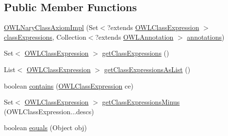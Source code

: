 \subsection*{Public Member Functions}
\begin{DoxyCompactItemize}
\item 
\hyperlink{classuk_1_1ac_1_1manchester_1_1cs_1_1owl_1_1owlapi_1_1_o_w_l_nary_class_axiom_impl_a10f07e8cffe3b2b0a3850e8b11f26d60}{O\-W\-L\-Nary\-Class\-Axiom\-Impl} (Set$<$?extends \hyperlink{interfaceorg_1_1semanticweb_1_1owlapi_1_1model_1_1_o_w_l_class_expression}{O\-W\-L\-Class\-Expression} $>$ \hyperlink{classuk_1_1ac_1_1manchester_1_1cs_1_1owl_1_1owlapi_1_1_o_w_l_nary_class_axiom_impl_a1f49ad91a00e2548f99a93ca8de82f7c}{class\-Expressions}, Collection$<$?extends \hyperlink{interfaceorg_1_1semanticweb_1_1owlapi_1_1model_1_1_o_w_l_annotation}{O\-W\-L\-Annotation} $>$ \hyperlink{classuk_1_1ac_1_1manchester_1_1cs_1_1owl_1_1owlapi_1_1_o_w_l_axiom_impl_af6fbf6188f7bdcdc6bef5766feed695e}{annotations})
\item 
Set$<$ \hyperlink{interfaceorg_1_1semanticweb_1_1owlapi_1_1model_1_1_o_w_l_class_expression}{O\-W\-L\-Class\-Expression} $>$ \hyperlink{classuk_1_1ac_1_1manchester_1_1cs_1_1owl_1_1owlapi_1_1_o_w_l_nary_class_axiom_impl_a4fd9d265e883404fe3065850664a2f5b}{get\-Class\-Expressions} ()
\item 
List$<$ \hyperlink{interfaceorg_1_1semanticweb_1_1owlapi_1_1model_1_1_o_w_l_class_expression}{O\-W\-L\-Class\-Expression} $>$ \hyperlink{classuk_1_1ac_1_1manchester_1_1cs_1_1owl_1_1owlapi_1_1_o_w_l_nary_class_axiom_impl_a09237d0c7ab7c3bbdf4d7607121cada1}{get\-Class\-Expressions\-As\-List} ()
\item 
boolean \hyperlink{classuk_1_1ac_1_1manchester_1_1cs_1_1owl_1_1owlapi_1_1_o_w_l_nary_class_axiom_impl_ae4ddd9a397c0073d0f40a14d40e9b4a3}{contains} (\hyperlink{interfaceorg_1_1semanticweb_1_1owlapi_1_1model_1_1_o_w_l_class_expression}{O\-W\-L\-Class\-Expression} ce)
\item 
Set$<$ \hyperlink{interfaceorg_1_1semanticweb_1_1owlapi_1_1model_1_1_o_w_l_class_expression}{O\-W\-L\-Class\-Expression} $>$ \hyperlink{classuk_1_1ac_1_1manchester_1_1cs_1_1owl_1_1owlapi_1_1_o_w_l_nary_class_axiom_impl_a05a535bed867b803a3290444f43eb589}{get\-Class\-Expressions\-Minus} (O\-W\-L\-Class\-Expression...\-descs)
\item 
boolean \hyperlink{classuk_1_1ac_1_1manchester_1_1cs_1_1owl_1_1owlapi_1_1_o_w_l_nary_class_axiom_impl_a432e9e71e1f06fa5c63568b2d1ae7edc}{equals} (Object obj)
\end{DoxyCompactItemize}
